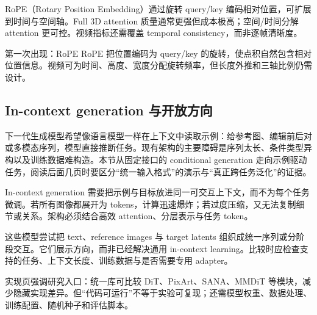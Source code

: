 
RoPE（Rotary Position Embedding）通过旋转 query/key 编码相对位置，可扩展到时间与空间轴。Full 3D attention 质量通常更强但成本极高；空间/时间分解 attention 更可控。视频指标还需覆盖 temporal consistency，而非逐帧清晰度。


\begin{knowledgebox}{第一次出现：RoPE}
RoPE 把位置编码为 query/key 的旋转，使点积自然包含相对位置信息。视频可为时间、高度、宽度分配旋转频率，但长度外推和三轴比例仍需设计。
\end{knowledgebox}

\subsection{In-context generation 与开放方向}

下一代生成模型希望像语言模型一样在上下文中读取示例：给参考图、编辑前后对或多模态序列，模型直接推断任务。现有架构的主要障碍是序列太长、条件类型异构以及训练数据难构造。本节从固定接口的 conditional generation 走向示例驱动任务，阅读后面几页时要区分“统一输入格式”的演示与“真正跨任务泛化”的证据。


In-context generation 需要把示例与目标放进同一可交互上下文，而不为每个任务微调。若所有图像都展开为 tokens，计算迅速爆炸；若过度压缩，又无法复制细节或关系。架构必须结合高效 attention、分层表示与任务 token。


这些模型尝试把 text、reference images 与 target latents 组织成统一序列或分阶段交互。它们展示方向，而非已经解决通用 in-context learning。比较时应检查支持的任务、上下文长度、训练数据与是否需要专用 adapter。


实现页强调研究入口：统一库可比较 DiT、PixArt、SANA、MMDiT 等模块，减少隐藏实现差异。但“代码可运行”不等于实验可复现；还需模型权重、数据处理、训练配置、随机种子和评估脚本。


